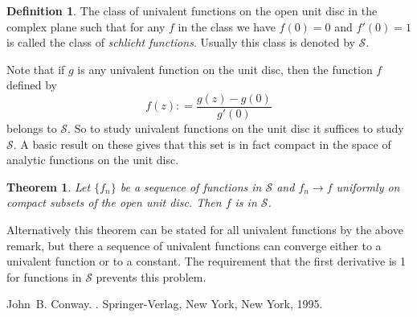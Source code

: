 \documentclass[12pt]{article}
\theoremstyle{theorem}
\newtheorem*{thm}{Theorem}
\theoremstyle{definition}
\newtheorem*{defn}{Definition}
\begin{document}
\begin{defn}
The class of univalent functions on the open unit disc in the complex plane
such that for any $f$ in the class we have $f(0) = 0$ and $f'(0) = 1$ is called
the class of {\em schlicht functions}.  Usually this class is denoted by
${\mathcal{S}}$.
\end{defn}

Note that if $g$ is any univalent function on the unit disc, then the function
$f$ defined by
\begin{equation*}
f(z): = \frac{g(z) - g(0)}{g'(0)}
\end{equation*}
belongs to ${\mathcal{S}}$.  So to study univalent functions on the unit disc it  suffices to study ${\mathcal{S}}$.  A basic result on these gives that this set is in fact compact in the space of analytic functions on the unit disc.  

\begin{thm}
Let $\{ f_n \}$ be a sequence of functions in ${\mathcal{S}}$ and
$f_n \to f$ uniformly on compact subsets of the open unit disc.  Then $f$
is in ${\mathcal{S}}$.
\end{thm}

Alternatively this theorem can be stated for all univalent functions by the above remark, but there a sequence of univalent functions can converge either
to a univalent function or to a constant.  The requirement that the first derivative is 1 for functions in ${\mathcal{S}}$ prevents this problem.

\begin{thebibliography}{9}
John~B. Conway.
{\em {}}.
Springer-Verlag, New York, New York, 1995.
\end{thebibliography}
\end{document}
